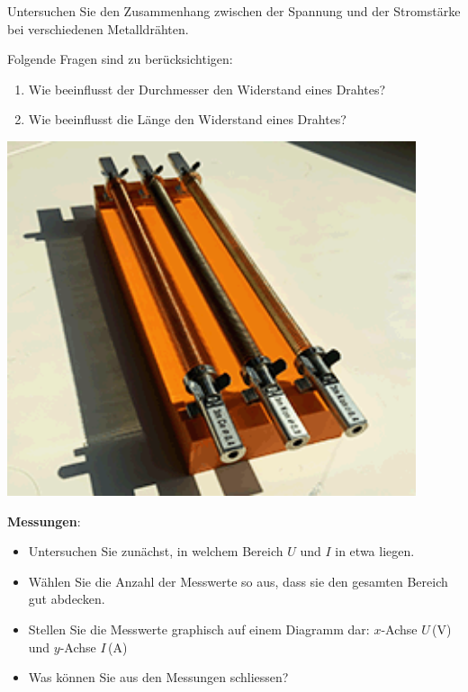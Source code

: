 \documentclass[11pt]{article}
\begin{document}
\begin{minipage}{0.7\textwidth}
	Untersuchen Sie den Zusammenhang zwischen der Spannung und der Stromstärke bei verschiedenen Metalldrähten. 

	Folgende Fragen sind zu berücksichtigen:

	\begin{enumerate}
		\item Wie beeinflusst der Durchmesser den Widerstand eines Drahtes?
		\item Wie beeinflusst die Länge den Widerstand eines Drahtes?
	\end{enumerate}
\end{minipage}
\begin{minipage}{0.25\textwidth}
	\begin{flushright}
		\includegraphics[width=0.9\textwidth]{images/wires.png}
	\end{flushright}
\end{minipage}

\vspace{0.5cm}
\textbf{Messungen}:

\vspace{-0.3cm}
\begin{itemize}[label=-]
    \item Untersuchen Sie zunächst, in welchem Bereich $U$ und $I$ in etwa liegen.
    \item Wählen Sie die Anzahl der Messwerte so aus, dass sie den gesamten Bereich gut abdecken.
    \item Stellen Sie die Messwerte graphisch auf einem Diagramm dar:     
    $x$-Achse $U\,$(V) und $y$-Achse $I\,$(A)
    \item Was können Sie aus den Messungen schliessen?
\end{itemize}
  
\end{document}
